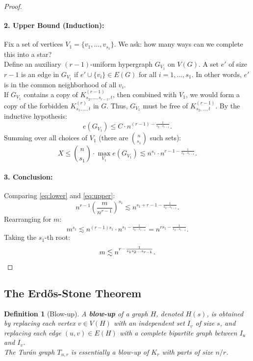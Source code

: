 \documentclass[a4paper]{article}
\newtheorem{defn}[thm]{Definition}
\begin{document}
\begin{proof}
        \paragraph{2. Upper Bound (Induction):}
        Fix a set of vertices $V_1 = \{v_1, \dots, v_{s_1}\}$. We ask: how many ways can we complete this into a star?\\
        Define an auxiliary $(r-1)$-uniform hypergraph $G_{V_1}$ on $V(G)$. A set $e'$ of size $r-1$ is an edge in $G_{V_1}$ if $e' \cup \{v_i\} \in E(G)$ for all $i=1, \dots, s_1$. In other words, $e'$ is in the common neighborhood of all $v_i$.\\
        If $G_{V_1}$ contains a copy of $K_{s_2, \dots, s_{r-1}, t}^{(r-1)}$, then combined with $V_1$, we would form a copy of the forbidden $K_{s_1, \dots, t}^{(r)}$ in $G$.
        Thus, $G_{V_1}$ must be free of $K_{s_2, \dots, t}^{(r-1)}$. By the inductive hypothesis:
        \[
        e(G_{V_1}) \leq C \cdot n^{(r-1) - \frac{1}{s_2 \dots s_{r-1}}}.
        \]
        Summing over all choices of $V_1$ (there are $\binom{n}{s_1}$ such sets):
        \begin{equation} \label{eq:upper}
            X \leq \binom{n}{s_1} \cdot \max_{V_1} e(G_{V_1}) \lesssim n^{s_1} \cdot n^{r-1 - \frac{1}{s_2 \dots s_{r-1}}}.
        \end{equation}

        \paragraph{3. Conclusion:}
        Comparing \eqref{eq:lower} and \eqref{eq:upper}:
        \[
        n^{r-1} \left( \frac{m}{n^{r-1}} \right)^{s_1} \lesssim n^{s_1 + r - 1 - \frac{1}{s_2 \dots s_{r-1}}}.
        \]
        Rearranging for $m$:
        \[
        m^{s_1} \lesssim n^{(r-1)s_1} \cdot n^{s_1 - \frac{1}{s_2 \dots s_{r-1}}} = n^{rs_1 - \frac{1}{s_2 \dots s_{r-1}}}.
        \]
        Taking the $s_1$-th root:
        \[
        m \lesssim n^{r - \frac{1}{s_1 s_2 \dots s_{r-1}}}. \qedhere
        \]
\end{proof}

\subsection{The Erd\H{o}s-Stone Theorem}

\begin{defn}[Blow-up]
    A \textbf{blow-up} of a graph $H$, denoted $H(s)$, is obtained by replacing each vertex $v \in V(H)$ with an independent set $I_v$ of size $s$, and replacing each edge $(u,v) \in E(H)$ with a complete bipartite graph between $I_u$ and $I_v$.\\
    The Turán graph $T_{n,r}$ is essentially a blow-up of $K_r$ with parts of size $n/r$.
\end{defn}
\end{document}
